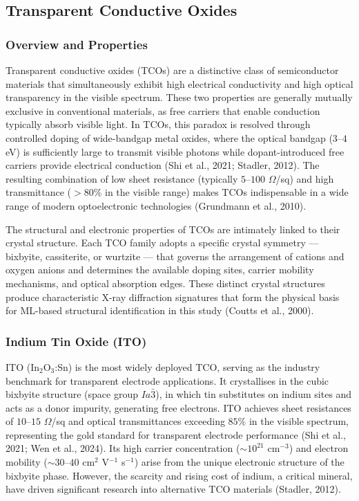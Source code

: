 \documentclass[12pt, oneside]{article} %
\begin{document}
\subsection{Transparent Conductive Oxides}

\subsubsection{Overview and Properties}

Transparent conductive oxides (TCOs) are a distinctive class of semiconductor materials that simultaneously exhibit high electrical conductivity and high optical transparency in the visible spectrum. These two properties are generally mutually exclusive in conventional materials, as free carriers that enable conduction typically absorb visible light. In TCOs, this paradox is resolved through controlled doping of wide-bandgap metal oxides, where the optical bandgap ($3$--$4$ eV) is sufficiently large to transmit visible photons while dopant-introduced free carriers provide electrical conduction (Shi et al., 2021; Stadler, 2012). The resulting combination of low sheet resistance (typically $5$--$100$ $\Omega$/sq) and high transmittance ($>80\%$ in the visible range) makes TCOs indispensable in a wide range of modern optoelectronic technologies (Grundmann et al., 2010).

The structural and electronic properties of TCOs are intimately linked to their crystal structure. Each TCO family adopts a specific crystal symmetry --- bixbyite, cassiterite, or wurtzite --- that governs the arrangement of cations and oxygen anions and determines the available doping sites, carrier mobility mechanisms, and optical absorption edges. These distinct crystal structures produce characteristic X-ray diffraction signatures that form the physical basis for ML-based structural identification in this study (Coutts et al., 2000).


\subsubsection{Indium Tin Oxide (ITO)}

ITO ($\text{In}_2\text{O}_3$:Sn) is the most widely deployed TCO, serving as the industry benchmark for transparent electrode applications. It crystallises in the cubic bixbyite structure (space group $Ia\bar{3}$), in which tin substitutes on indium sites and acts as a donor impurity, generating free electrons. ITO achieves sheet resistances of $10$--$15$ $\Omega$/sq and optical transmittances exceeding $85\%$ in the visible spectrum, representing the gold standard for transparent electrode performance (Shi et al., 2021; Wen et al., 2024). Its high carrier concentration ($\sim 10^{21}$ cm$^{-3}$) and electron mobility ($\sim 30$--$40$ cm$^2$ V$^{-1}$ s$^{-1}$) arise from the unique electronic structure of the bixbyite phase. However, the scarcity and rising cost of indium, a critical mineral, have driven significant research into alternative TCO materials (Stadler, 2012).
\end{document}
